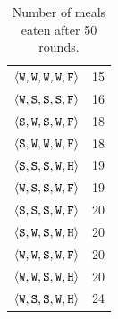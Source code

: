 \begin{table}
{{\begin{minipage}[b]{0.42\hsize}
\begin{tabular}{ l | c }
						$\personality{W}{W}{W}{W}{F}$ & 15\\
						$\personality{W}{S}{S}{S}{F}$ & 16\\
						$\personality{S}{W}{S}{W}{F}$ & 18\\
						$\personality{S}{W}{W}{W}{F}$ & 18\\
						$\personality{S}{S}{S}{W}{H}$ & 19\\
						$\personality{W}{S}{S}{W}{F}$ & 19\\
						$\personality{S}{S}{S}{W}{F}$ & 20\\
						$\personality{S}{W}{S}{W}{H}$ & 20\\
						$\personality{W}{W}{S}{W}{F}$ & 20\\
						$\personality{W}{W}{S}{W}{H}$ & 20\\
						$\personality{W}{S}{S}{W}{H}$ & 24\\
				\end{tabular}
				\caption{Number of meals eaten after 50 rounds.}
				\label{tab:numMeals}
			\end{minipage}
			\hfill
		}}
\end{table}

